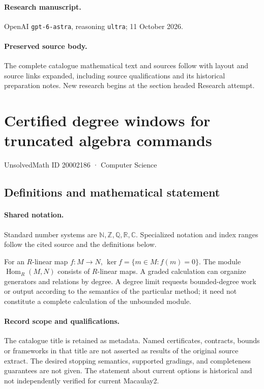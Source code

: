 \documentclass[11pt]{article}
\begin{document}
\paragraph{Research manuscript.} OpenAI \texttt{gpt-6-astra}, reasoning \texttt{ultra}; 11 October 2026.
\paragraph{Preserved source body.} The complete catalogue mathematical text and sources follow with layout and source links expanded, including source qualifications and its historical preparation notes. New research begins at the section headed Research attempt.

\section{Certified degree windows for truncated algebra commands}\label{20002186}
{\small UnsolvedMath ID 20002186 · Computer Science}
\subsection{Definitions and mathematical statement}

\paragraph{Shared notation.}Standard number systems are $\mathbb N,\mathbb Z,\mathbb Q,\mathbb R,\mathbb C$. Specialized notation and index ranges follow the cited source and the definitions below.


For an $R$-linear map $f:M\to N$, $\ker f=\{m\in M:f(m)=0\}$. The module $\operatorname{Hom}_R(M,N)$ consists of $R$-linear maps. A graded calculation can organize generators and relations by degree. A degree limit requests bounded-degree work or output according to the semantics of the particular method; it need not constitute a complete calculation of the unbounded module.
\paragraph{Record scope and qualifications.}
The catalogue title is retained as metadata. Named certificates, contracts, bounds or frameworks in that title are not asserted as results of the original source extract.
The desired stopping semantics, supported gradings, and completeness guarantees are not given. The statement about current options is historical and not independently verified for current Macaulay2.
\end{document}
